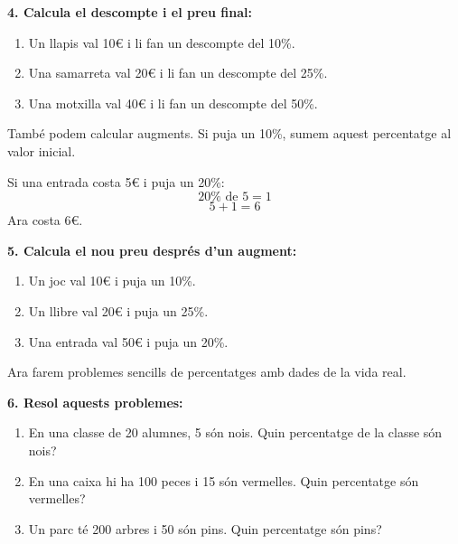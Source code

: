 \documentclass[12pt,a4paper]{article}
\begin{document}
\textbf{4. Calcula el descompte i el preu final:}
\begin{enumerate}[label=\alph*)]
    \item Un llapis val 10€ i li fan un descompte del 10\%. \vspace{0.8cm}
    \item Una samarreta val 20€ i li fan un descompte del 25\%. \vspace{0.8cm}
    \item Una motxilla val 40€ i li fan un descompte del 50\%. \vspace{0.8cm}
\end{enumerate}

\begin{capsula}
També podem calcular augments. Si puja un 10\%, sumem aquest percentatge al valor inicial.
\end{capsula}

\begin{exemple}
Si una entrada costa 5€ i puja un 20\%:
\[
20\% \text{ de } 5 = 1
\]
\[
5+1=6
\]
Ara costa 6€.
\end{exemple}

\textbf{5. Calcula el nou preu després d'un augment:}
\begin{enumerate}[label=\alph*)]
    \item Un joc val 10€ i puja un 10\%. \vspace{0.8cm}
    \item Un llibre val 20€ i puja un 25\%. \vspace{0.8cm}
    \item Una entrada val 50€ i puja un 20\%. \vspace{0.8cm}
\end{enumerate}

\begin{capsula}
Ara farem problemes sencills de percentatges amb dades de la vida real.
\end{capsula}

\textbf{6. Resol aquests problemes:}
\begin{enumerate}[label=\alph*)]
    \item En una classe de 20 alumnes, 5 són nois. Quin percentatge de la classe són nois? \vspace{1cm}
    \item En una caixa hi ha 100 peces i 15 són vermelles. Quin percentatge són vermelles? \vspace{1cm}
    \item Un parc té 200 arbres i 50 són pins. Quin percentatge són pins? \vspace{1cm}
\end{enumerate}
\end{document}
